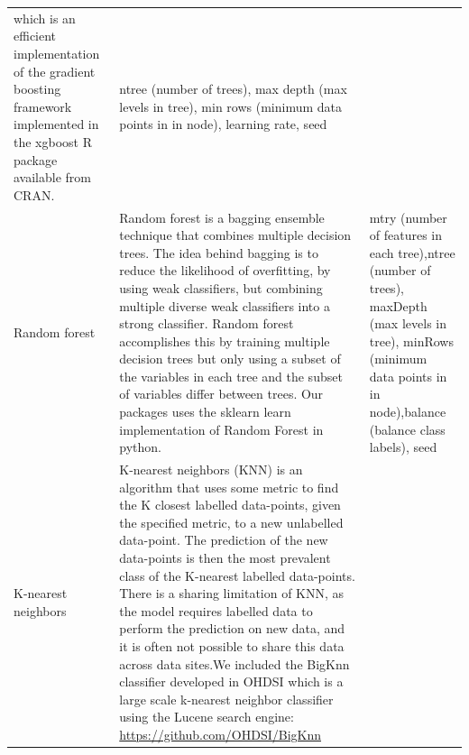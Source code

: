 \documentclass[]{book}
\begin{document}
\begin{longtable}[]{@{}lll@{}}
\begin{minipage}[t]{0.55\columnwidth}
which is an efficient implementation of the gradient boosting framework
implemented in the xgboost R package available from CRAN.\strut
\end{minipage} & \begin{minipage}[t]{0.25\columnwidth}\raggedright\strut
ntree (number of trees), max depth (max levels in tree), min rows
(minimum data points in in node), learning rate, seed\strut
\end{minipage}\tabularnewline
\begin{minipage}[t]{0.12\columnwidth}\raggedright\strut
Random forest\strut
\end{minipage} & \begin{minipage}[t]{0.55\columnwidth}\raggedright\strut
Random forest is a bagging ensemble technique that combines multiple
decision trees. The idea behind bagging is to reduce the likelihood of
overfitting, by using weak classifiers, but combining multiple diverse
weak classifiers into a strong classifier. Random forest accomplishes
this by training multiple decision trees but only using a subset of the
variables in each tree and the subset of variables differ between trees.
Our packages uses the sklearn learn implementation of Random Forest in
python.\strut
\end{minipage} & \begin{minipage}[t]{0.25\columnwidth}\raggedright\strut
mtry (number of features in each tree),ntree (number of trees), maxDepth
(max levels in tree), minRows (minimum data points in in node),balance
(balance class labels), seed\strut
\end{minipage}\tabularnewline
\begin{minipage}[t]{0.12\columnwidth}\raggedright\strut
K-nearest neighbors\strut
\end{minipage} & \begin{minipage}[t]{0.55\columnwidth}\raggedright\strut
K-nearest neighbors (KNN) is an algorithm that uses some metric to find
the K closest labelled data-points, given the specified metric, to a new
unlabelled data-point. The prediction of the new data-points is then the
most prevalent class of the K-nearest labelled data-points. There is a
sharing limitation of KNN, as the model requires labelled data to
perform the prediction on new data, and it is often not possible to
share this data across data sites.We included the BigKnn classifier
developed in OHDSI which is a large scale k-nearest neighbor classifier
using the Lucene search engine:
\url{https://github.com/OHDSI/BigKnn}\strut
\end{minipage} & \begin{minipage}[t]{0.25\columnwidth}\raggedright\strut

\end{minipage}
\end{longtable}
\end{document}
